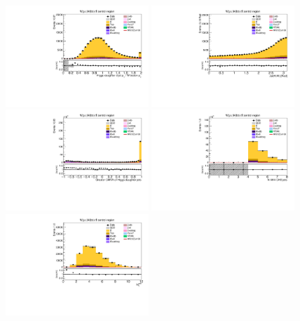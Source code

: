 \begin{figure}[tbp]
  \begin{center}
    \includegraphics[width=0.48\textwidth]{figures/wlnhbb2016/resolved/WmnWH2TopCR_pTBalanceDijetW.pdf}
    \includegraphics[width=0.48\textwidth]{figures/wlnhbb2016/resolved/WmnWH2TopCR_deltaPhiVH.pdf}
    \includegraphics[width=0.48\textwidth]{figures/wlnhbb2016/resolved/WmnWH2TopCR_bDiscrMax.pdf}
    \includegraphics[width=0.48\textwidth]{figures/wlnhbb2016/resolved/WmnWH2TopCR_nJet.pdf}
    \includegraphics[width=0.48\textwidth]{figures/wlnhbb2016/resolved/WmnWH2TopCR_nSoft5.pdf}

\end{center}
\end{figure}
